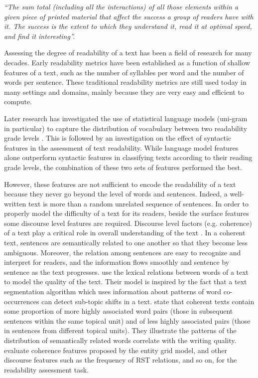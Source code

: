\emph{``The sum total (including all the interactions) of all those elements within a given piece of printed material that affect the success a group of readers have with it. 
The success is the extent to which they understand it, read it at optimal speed, and find it interesting''.}

Assessing the degree of readability of a text has been a field of research for many decades. 
Early readability metrics \cite{flesch48,kincaid75} have been established as a function of shallow features of a text, such as the number of syllables per word and the number of words per sentence. 
These traditional readability metrics are still used today in many settings and domains, mainly because they are very easy and efficient to compute.  

Later research has investigated the use of statistical language models 
(uni-gram in particular) to capture the distribution of vocabulary between two readability grade levels
\cite{siluo01,collins-thompson04}. 
This is followed by an investigation on the effect of syntactic features \cite{schwarm05,heilman07,petersen09} in the assessment of text readability. 
While language model features alone outperform syntactic features in classifying texts according to their reading grade levels, the combination of these two sets of features performed the best. 

However, these features are not sufficient to encode the readability of a text  because they never go beyond the level of words and sentences. 
Indeed, a well-written text is more than a random unrelated sequence of sentences. 
In order to properly model the difficulty of a text for its readers, beside the surface features some discourse level features  are required. 
Discourse level factors (e.g. coherence) of a text play a critical role in overall understanding of the text \cite{pitler08}.  
In a coherent text, sentences are semantically related to one another so that they become less ambiguous.   
Moreover, the relation among sentences are easy to recognize and interpret for readers, and the information flows smoothly and sentence by sentence as the text progresses. 
 use the lexical relations between words of a text to model the quality of the text. 
Their model is inspired by the fact that a text segmentation algorithm which uses information about patterns of word co-occurrences can detect sub-topic shifts in a text. 
 state that coherent texts contain some proportion of more highly associated word pairs (those in subsequent sentences within the same topical unit) and of less highly associated pairs (those in sentences from different topical units).  
They illustrate the patterns of the distribution of semantically related words correlate with the writing quality. 
 evaluate coherence features proposed by the entity grid model, and other discourse features such as the frequency of RST relations, and so on, for the readability assessment task.  

